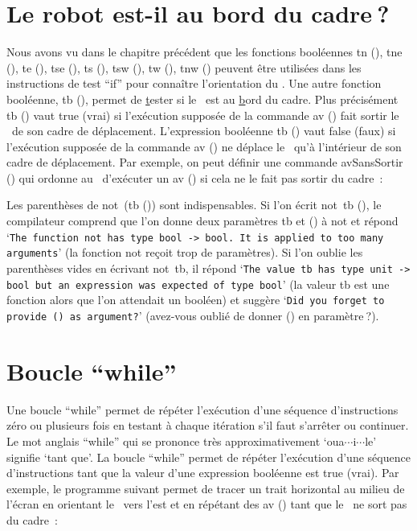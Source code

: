 \section{Le robot est-il au bord du cadre$\:$?}
Nous avons vu dans le chapitre précédent que les fonctions booléennes {\idt tn ()}, {\idt tne ()}, {\idt te ()}, {\idt tse ()}, {\idt ts ()},
 {\idt tsw ()}, {\idt tw ()}, {\idt tnw ()} peuvent être utilisées dans les instructions
 de test ``if'' pour connaître l'orientation du \robot. Une autre  fonction booléenne,
 {\idt tb ()}, permet de \underline{t}ester si
 le \robot\ est au \underline{b}ord du cadre. Plus précisément {\idt tb ()} vaut {\idt true} (vrai)
 si l'exécution supposée de la  commande {\idt av ()} fait sortir
 le \robot\ de son cadre de déplacement.  L'expression booléenne
 {\idt tb ()} vaut {\idt false} (faux) si l'exécution supposée
 de la  commande {\idt av ()} ne déplace le \robot\ qu'à l'intérieur de son cadre de déplacement.
Par exemple, on peut
 définir une commande {\idt avSansSortir ()} qui ordonne au \robot\ d'exécuter un {\idt av ()} si cela ne le
 fait pas sortir du cadre~:



{\sloppy\noindent Les parenthèses de {\mcl not}\ {\idt (tb ())} sont indispensables. Si l'on écrit
{\mcl not}\ {\idt tb ()}, le compilateur comprend que l'on donne deux paramètres {\idt tb}
et {\idt ()} à {\mcl not} et répond `{\tt The function not has type bool -> bool. It is
applied to too many arguments}' (la fonction {\mcl not} reçoit trop de paramètres). Si l'on
oublie les parenthèses vides en écrivant {\mcl not}\ {\idt tb}, il répond
`{\tt The value tb has type unit -> bool but an expression was expected of type bool}'
(la valeur {\idt tb} est une fonction alors que l'on attendait un booléen) et suggère
`{\tt Did you forget to provide () as argument?}' (avez-vous oublié de donner {\idt ()}
en paramètre$\:$?).\par}

\section{Boucle ``while''}

 Une boucle ``while'' permet de répéter l'exécution d'une séquence d'ins\-truc\-tions zéro
ou plusieurs fois en testant à chaque itération s'il faut s'arrêter ou continuer. Le mot anglais
``while'' qui se prononce très approximativement `oua$\cdots$i$\cdots$le' signifie `tant que'. La boucle ``while'' permet de
répéter l'exécution d'une séquence d'instructions tant que la valeur d'une expression booléenne
est {\idt true} (vrai). Par exemple, le programme suivant permet de tracer un trait horizontal au milieu
de l'écran en orientant le \robot\ vers l'est et en répétant des {\idt av ()} tant que le \robot\ ne sort
pas du cadre~:

